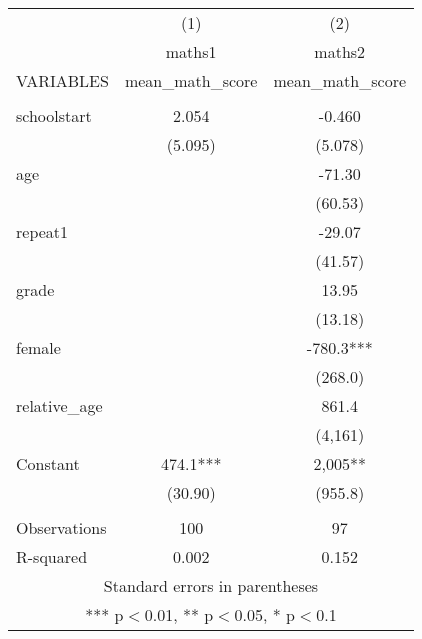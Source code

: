 \documentclass[]{article}
\begin{document}
\begin{tabular}{lcc} \hline
 & (1) & (2) \\
 & maths1 & maths2 \\
VARIABLES & mean\_math\_score & mean\_math\_score \\ \hline
 &  &  \\
schoolstart & 2.054 & -0.460 \\
 & (5.095) & (5.078) \\
age &  & -71.30 \\
 &  & (60.53) \\
repeat1 &  & -29.07 \\
 &  & (41.57) \\
grade &  & 13.95 \\
 &  & (13.18) \\
female &  & -780.3*** \\
 &  & (268.0) \\
relative\_age &  & 861.4 \\
 &  & (4,161) \\
Constant & 474.1*** & 2,005** \\
 & (30.90) & (955.8) \\
 &  &  \\
Observations & 100 & 97 \\
 R-squared & 0.002 & 0.152 \\ \hline
\multicolumn{3}{c}{ Standard errors in parentheses} \\
\multicolumn{3}{c}{ *** p$<$0.01, ** p$<$0.05, * p$<$0.1} \\
\end{tabular}
\end{document}
